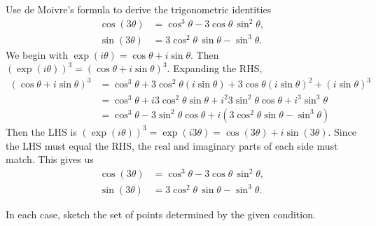 \documentclass[11pt]{exam}
\begin{document}
\begin{questions}
\question Use de Moivre's formula to derive the trigonometric
identities
\begin{align*}
  \cos (3\theta) &= \cos^3 \theta - 3 \cos \theta \, \sin^2 \theta, \\
  \sin (3\theta) &= 3 \cos^2 \theta \, \sin \theta -  \sin^3 \theta.
\end{align*}
We begin with $\exp (i\theta) = \cos \theta + i \sin \theta$.
Then $(\exp (i\theta))^3 = (\cos \theta + i \sin \theta)^3$.
Expanding the RHS,
\begin{align*}
    (\cos \theta + i \sin \theta)^3
    &= \cos ^3 \theta + 3 \cos ^2 \theta (i \sin \theta) + 3 \cos \theta (i \sin \theta)^2 + (i \sin \theta)^3 \\
    &= \cos ^3 \theta + i3 \cos ^2 \theta \sin \theta + i^2 3 \sin ^2 \theta \cos \theta + i^3 \sin ^3 \theta \\
    &= \cos ^3 \theta - 3 \sin ^2 \theta \cos \theta + i(3 \cos ^2 \theta \sin \theta - \sin ^3 \theta)
\end{align*}
Then the LHS is $(\exp (i\theta))^3 = \exp (i3\theta) = \cos (3 \theta) + i \sin (3 \theta)$.
Since the LHS must equal the RHS, the real and imaginary parts of each side must match.
This gives us
\begin{align*}
  \cos (3\theta) &= \cos^3 \theta - 3 \cos \theta \, \sin^2 \theta, \\
  \sin (3\theta) &= 3 \cos^2 \theta \, \sin \theta -  \sin^3 \theta.
\end{align*}

\question In each case, sketch the set of points determined by the
given condition.
\end{questions}
\end{document}
